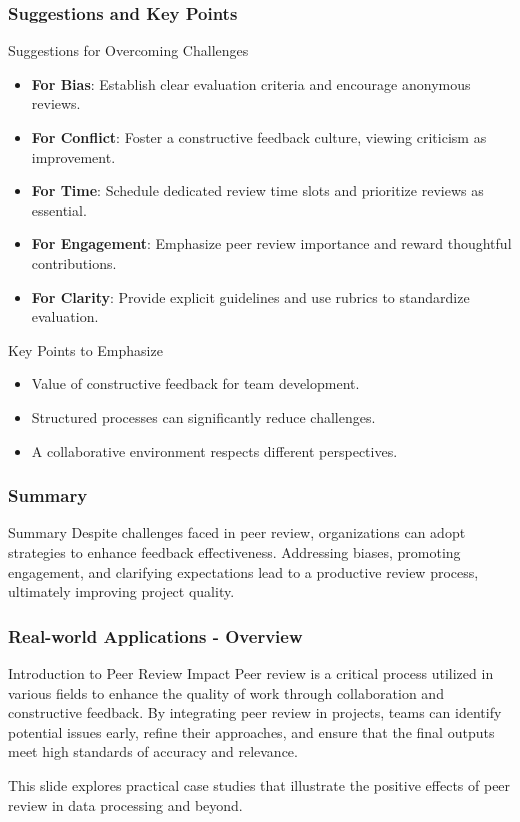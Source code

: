 \documentclass{beamer}
\begin{document}
\begin{frame}[fragile]
    \frametitle{Suggestions and Key Points}
    \begin{block}{Suggestions for Overcoming Challenges}
        \begin{itemize}
            \item \textbf{For Bias}: Establish clear evaluation criteria and encourage anonymous reviews.
            \item \textbf{For Conflict}: Foster a constructive feedback culture, viewing criticism as improvement.
            \item \textbf{For Time}: Schedule dedicated review time slots and prioritize reviews as essential.
            \item \textbf{For Engagement}: Emphasize peer review importance and reward thoughtful contributions.
            \item \textbf{For Clarity}: Provide explicit guidelines and use rubrics to standardize evaluation.
        \end{itemize}
    \end{block}

    \begin{block}{Key Points to Emphasize}
        \begin{itemize}
            \item Value of constructive feedback for team development.
            \item Structured processes can significantly reduce challenges.
            \item A collaborative environment respects different perspectives.
        \end{itemize}
    \end{block}
\end{frame}

\begin{frame}[fragile]
    \frametitle{Summary}
    \begin{block}{Summary}
        Despite challenges faced in peer review, organizations can adopt strategies to enhance feedback effectiveness. Addressing biases, promoting engagement, and clarifying expectations lead to a productive review process, ultimately improving project quality.
    \end{block}
\end{frame}

\begin{frame}[fragile]
    \frametitle{Real-world Applications - Overview}
    \begin{block}{Introduction to Peer Review Impact}
        Peer review is a critical process utilized in various fields to enhance the quality of work through collaboration and constructive feedback. By integrating peer review in projects, teams can identify potential issues early, refine their approaches, and ensure that the final outputs meet high standards of accuracy and relevance.
    \end{block}
    This slide explores practical case studies that illustrate the positive effects of peer review in data processing and beyond.
\end{frame}
\end{document}
